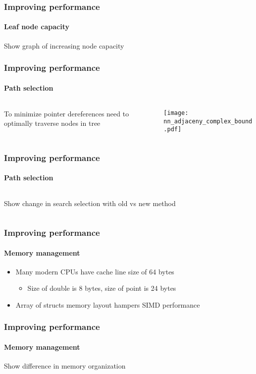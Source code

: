 
\begin{frame}
  \frametitle{Improving performance}
  \framesubtitle{Leaf node capacity}

  {\color{white} Show graph of increasing node capacity}

\end{frame}

\begin{frame}
  \frametitle{Improving performance}
  \framesubtitle{Path selection}

  \begin{columns}[T]
    \begin{column}{.4\textwidth}
      \begin{block}{}%
        {\color{white} To minimize pointer dereferences need to optimally%
        traverse nodes in tree}
      \end{block}
    \end{column}
    \begin{column}{.6\textwidth}
      \begin{block}{}
        \texttt{[image: nn\_adjaceny\_complex\_bound.pdf]}
      \end{block}
    \end{column}
  \end{columns}

\end{frame}

\begin{frame}
  \frametitle{Improving performance}
  \framesubtitle{Path selection}

  \begin{columns}[T]
    \begin{column}{.5\textwidth}
      \begin{block}{}%
        {\color{white}Show change in search selection with old vs new method}
      \end{block}
    \end{column}
    \begin{column}{.5\textwidth}
      \begin{block}{}
      \end{block}
    \end{column}
  \end{columns}

\end{frame}

\begin{frame}
  \frametitle{Improving performance}
  \framesubtitle{Memory management}

  \begin{itemize}
    \item Many modern CPUs have cache line size of 64 bytes
      \begin{itemize}
        \item Size of double is 8 bytes, size of point is 24 bytes
      \end{itemize}
    \item Array of structs memory layout hampers SIMD performance 
  \end{itemize}

\end{frame}

\begin{frame}
  \frametitle{Improving performance}
  \framesubtitle{Memory management}

  \color{white} Show difference in memory organization

\end{frame}
